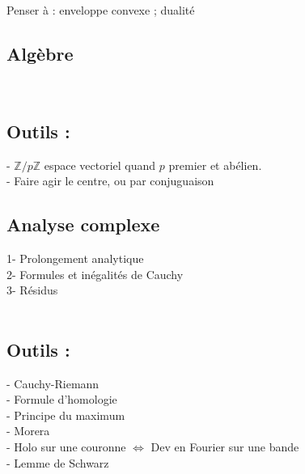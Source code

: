 \documentclass[11pt,a4paper]{article}
\begin{document}
Penser à : enveloppe convexe ; dualité
\begin{center}
\section*{Algèbre} 
\end{center}

~\\

\subsection*{Outils :}
- $\mathbb{Z}/p\mathbb{Z}$ espace vectoriel quand $p$ premier et abélien. \\
- Faire agir le centre, ou par conjuguaison




\newpage
\begin{center}
\section*{Analyse complexe} 
\end{center}

1- Prolongement analytique \\

2- Formules et inégalités de Cauchy \\

3- Résidus \\

~\\

\subsection*{Outils :}
- Cauchy-Riemann \\

- Formule d'homologie \\

- Principe du maximum \\

- Morera \\

- Holo sur une couronne $\Leftrightarrow$ Dev en Fourier sur une bande \\

- Lemme de Schwarz \\
\end{document}
